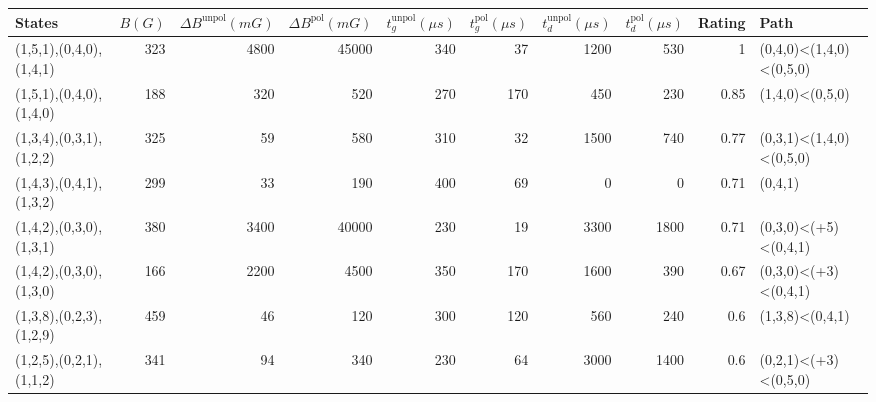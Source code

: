 \begin{tabular}{lrrrrrrrrl}
\hline
 {States}                &   {$B(G)$} &   {$\Delta B^{\text{unpol}}(mG)$} &   {$\Delta B^{\text{pol}}(mG)$} &   {$t^{\text{unpol}}_{g}(\mu s)$} &   {$t^{\text{pol}}_{g}(\mu s)$} &   {$t^{\text{unpol}}_{d}(\mu s)$} &   {$t^{\text{pol}}_{d}(\mu s)$} &   {Rating} & {Path}                  \\
\hline
 (1,5,1),(0,4,0),(1,4,1) &        323 &                              4800 &                           45000 &                               340 &                              37 &                              1200 &                             530 &       1    & (0,4,0)<(1,4,0)<(0,5,0) \\
 (1,5,1),(0,4,0),(1,4,0) &        188 &                               320 &                             520 &                               270 &                             170 &                               450 &                             230 &       0.85 & (1,4,0)<(0,5,0)         \\
 (1,3,4),(0,3,1),(1,2,2) &        325 &                                59 &                             580 &                               310 &                              32 &                              1500 &                             740 &       0.77 & (0,3,1)<(1,4,0)<(0,5,0) \\
 (1,4,3),(0,4,1),(1,3,2) &        299 &                                33 &                             190 &                               400 &                              69 &                                 0 &                               0 &       0.71 & (0,4,1)                 \\
 (1,4,2),(0,3,0),(1,3,1) &        380 &                              3400 &                           40000 &                               230 &                              19 &                              3300 &                            1800 &       0.71 & (0,3,0)<(+5)<(0,4,1)    \\
 (1,4,2),(0,3,0),(1,3,0) &        166 &                              2200 &                            4500 &                               350 &                             170 &                              1600 &                             390 &       0.67 & (0,3,0)<(+3)<(0,4,1)    \\
 (1,3,8),(0,2,3),(1,2,9) &        459 &                                46 &                             120 &                               300 &                             120 &                               560 &                             240 &       0.6  & (1,3,8)<(0,4,1)         \\
 (1,2,5),(0,2,1),(1,1,2) &        341 &                                94 &                             340 &                               230 &                              64 &                              3000 &                            1400 &       0.6  & (0,2,1)<(+3)<(0,5,0)    \\
\hline
\end{tabular}